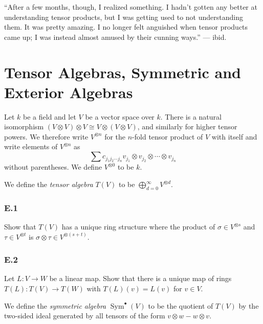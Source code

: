 \documentclass[lang=cn,11pt]{template}
\begin{document}
“After a few months, though, I realized something. I hadn’t gotten any better at understanding tensor products, but I was
getting used to not understanding them. It was pretty amazing. I no longer felt anguished when tensor products came up; I
was instead almost amused by their cunning ways.” — ibid.











\chapter{Tensor Algebras, Symmetric and Exterior Algebras}

Let \( k \) be a field and let \( V \) be a vector space over \( k \). There is a natural isomorphism \( (V \otimes V) \otimes V \cong V \otimes (V \otimes V) \), and similarly for higher tensor powers. We therefore write \( V^{\otimes n} \) for the \( n \)-fold tensor product of \( V \) with itself and write elements of \( V^{\otimes n} \) as
\[
\sum c_{j_1 j_2 \cdots j_n} v_{j_1} \otimes v_{j_2} \otimes \cdots \otimes v_{j_n}
\]
without parentheses. We define \( V^{\otimes 0} \) to be \( k \).

\begin{definition}
We define the \textit{tensor algebra} \( T(V) \) to be \( \bigoplus_{d=0}^{\infty} V^{\otimes d} \).
\end{definition}

\subsection*{E.1} Show that \( T(V) \) has a unique ring structure where the product of \( \sigma \in V^{\otimes s} \) and \( \tau \in V^{\otimes t} \) is \( \sigma \otimes \tau \in V^{\otimes (s+t)} \).

\subsection*{E.2} Let \( L : V \to W \) be a linear map. Show that there is a unique map of rings \( T(L) : T(V) \to T(W) \) with \( T(L)(v) = L(v) \) for \( v \in V \).

\begin{definition}
We define the \textit{symmetric algebra} \( \operatorname{Sym}^\bullet(V) \) to be the quotient of \( T(V) \) by the two-sided ideal generated by all tensors of the form \( v \otimes w - w \otimes v \).
\end{definition}
\end{document}
